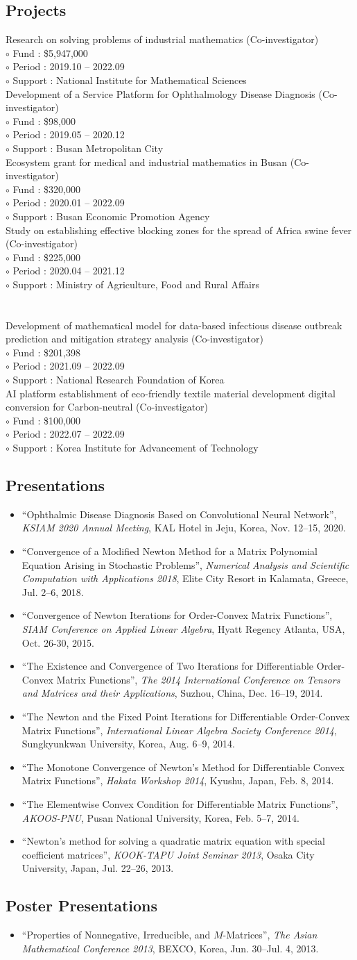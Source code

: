 \documentclass[11pt]{article} %
\newcommand\mypapers{
	
}
\newcommand\myprojseng{
	Research on solving problems of industrial mathematics (Co-investigator) \\
	$\circ$ Fund : \$5,947,000 \\
	$\circ$ Period : 2019.10 -- 2022.09 \\
	$\circ$ Support : National Institute for Mathematical Sciences \\
	
	Development of a Service Platform for Ophthalmology Disease Diagnosis (Co-investigator) \\
	$\circ$ Fund : \$98,000 \\
	$\circ$ Period : 2019.05 -- 2020.12 \\
	$\circ$ Support : Busan Metropolitan City \\
	
	Ecosystem grant for medical and industrial mathematics in Busan (Co-investigator) \\
	$\circ$ Fund : \$320,000 \\
	$\circ$ Period : 2020.01 -- 2022.09 \\
	$\circ$ Support : Busan Economic Promotion Agency \\
	
	Study on establishing effective blocking zones for the spread of Africa swine fever (Co-investigator) \\
	$\circ$ Fund : \$225,000 \\
	$\circ$ Period : 2020.04 -- 2021.12 \\
	$\circ$ Support : Ministry of Agriculture, Food and Rural Affairs \\
	~\\~\\
	
	Development of mathematical model for data-based infectious disease outbreak prediction and mitigation strategy analysis (Co-investigator) \\
	$\circ$ Fund : \$201,398 \\
	$\circ$ Period : 2021.09 -- 2022.09 \\
	$\circ$ Support : National Research Foundation of Korea \\
	
	AI platform establishment of eco-friendly textile material development digital conversion for Carbon-neutral (Co-investigator) \\
	$\circ$ Fund : \$100,000 \\
	$\circ$ Period : 2022.07 -- 2022.09 \\
	$\circ$ Support : Korea Institute for Advancement of Technology
}
\newcommand\mypresent{
	\begin{itemize}[leftmargin=*]
		\item ``Ophthalmic Disease Diagnosis Based on Convolutional Neural Network'', {\it KSIAM 2020 Annual Meeting}, KAL Hotel in Jeju, Korea, Nov. 12--15, 2020.
		\item ``Convergence of a Modified Newton Method for a Matrix Polynomial Equation Arising in Stochastic Problems'', {\it Numerical Analysis and Scientific Computation with Applications 2018}, Elite City Resort in Kalamata, Greece, Jul. 2--6, 2018.
		\item ``Convergence of Newton Iterations for Order-Convex Matrix Functions'', {\it SIAM Conference on Applied Linear Algebra}, Hyatt Regency Atlanta, USA, Oct. 26-30, 2015.
		\item ``The Existence and Convergence of Two Iterations for Differentiable Order-Convex Matrix Functions'', {\it The 2014 International Conference on Tensors and Matrices and their Applications}, Suzhou, China, Dec. 16--19, 2014.
		\item ``The Newton and the Fixed Point Iterations for Differentiable Order-Convex Matrix Functions'', {\it International Linear Algebra Society Conference 2014}, Sungkyunkwan University, Korea, Aug. 6--9, 2014.
		\item ``The Monotone Convergence of Newton’s Method for Differentiable Convex Matrix Functions'', {\it Hakata Workshop 2014}, Kyushu, Japan, Feb. 8, 2014.
		\item ``The Elementwise Convex Condition for Differentiable Matrix Functions'', {\it AKOOS-PNU}, Pusan National University, Korea, Feb. 5--7, 2014.
		\item ``Newton’s method for solving a quadratic matrix equation with special coefficient matrices'', {\it KOOK-TAPU Joint Seminar 2013}, Osaka City University, Japan, Jul. 22--26, 2013.
		
	\end{itemize}
}
\newcommand\myposter{
	\begin{itemize}[leftmargin=*]
		\item ``Properties of Nonnegative, Irreducible, and $M$-Matrices'', {\it The Asian Mathematical Conference 2013}, BEXCO, Korea, Jun. 30--Jul. 4, 2013.
	\end{itemize}
}
\begin{document}
\mypapers


\subsection*{Projects}
\myprojseng


\subsection*{Presentations}
\renewcommand\labelitemi{\tiny$\bullet$}
\mypresent

\subsection*{Poster Presentations}
\myposter


%
%
%
%
%
%
%

\end{document}
